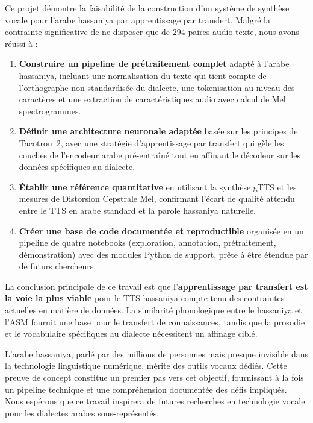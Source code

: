 \documentclass[12pt,a4paper]{article}
\begin{document}
Ce projet démontre la faisabilité de la construction d'un système de synthèse vocale pour l'arabe hassaniya par apprentissage par transfert. Malgré la contrainte significative de ne disposer que de 294 paires audio-texte, nous avons réussi à :

\begin{enumerate}
    \item \textbf{Construire un pipeline de prétraitement complet} adapté à l'arabe hassaniya, incluant une normalisation du texte qui tient compte de l'orthographe non standardisée du dialecte, une tokenisation au niveau des caractères et une extraction de caractéristiques audio avec calcul de Mel spectrogrammes.

    \item \textbf{Définir une architecture neuronale adaptée} basée sur les principes de Tacotron~2, avec une stratégie d'apprentissage par transfert qui gèle les couches de l'encodeur arabe pré-entraîné tout en affinant le décodeur sur les données spécifiques au dialecte.

    \item \textbf{Établir une référence quantitative} en utilisant la synthèse gTTS et les mesures de Distorsion Cepstrale Mel, confirmant l'écart de qualité attendu entre le TTS en arabe standard et la parole hassaniya naturelle.

    \item \textbf{Créer une base de code documentée et reproductible} organisée en un pipeline de quatre notebooks (exploration, annotation, prétraitement, démonstration) avec des modules Python de support, prête à être étendue par de futurs chercheurs.
\end{enumerate}

La conclusion principale de ce travail est que l'\textbf{apprentissage par transfert est la voie la plus viable} pour le TTS hassaniya compte tenu des contraintes actuelles en matière de données. La similarité phonologique entre le hassaniya et l'ASM fournit une base pour le transfert de connaissances, tandis que la prosodie et le vocabulaire spécifiques au dialecte nécessitent un affinage ciblé.

L'arabe hassaniya, parlé par des millions de personnes mais presque invisible dans la technologie linguistique numérique, mérite des outils vocaux dédiés. Cette preuve de concept constitue un premier pas vers cet objectif, fournissant à la fois un pipeline technique et une compréhension documentée des défis impliqués. Nous espérons que ce travail inspirera de futures recherches en technologie vocale pour les dialectes arabes sous-représentés.
\end{document}
